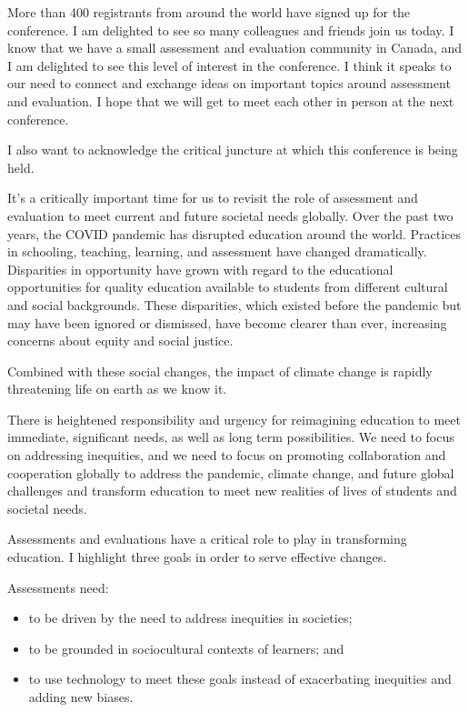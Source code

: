 \documentclass[
]{book}
\begin{document}
More than 400 registrants from around the world have signed up for the conference. I am delighted to see so many colleagues and friends join us today. I know that we have a small assessment and evaluation community in Canada, and I am delighted to see this level of interest in the conference. I think it speaks to our need to connect and exchange ideas on important topics around assessment and evaluation. I hope that we will get to meet each other in person at the next conference.

I also want to acknowledge the critical juncture at which this conference is being held.

It's a critically important time for us to revisit the role of assessment and evaluation to meet current and future societal needs globally. Over the past two years, the COVID pandemic has disrupted education around the world. Practices in schooling, teaching, learning, and assessment have changed dramatically. Disparities in opportunity have grown with regard to the educational opportunities for quality education available to students from different cultural and social backgrounds. These disparities, which existed before the pandemic but may have been ignored or dismissed, have become clearer than ever, increasing concerns about equity and social justice.

Combined with these social changes, the impact of climate change is rapidly threatening life on earth as we know it.

There is heightened responsibility and urgency for reimagining education to meet immediate, significant needs, as well as long term possibilities. We need to focus on addressing inequities, and we need to focus on promoting collaboration and cooperation globally to address the pandemic, climate change, and future global challenges and transform education to meet new realities of lives of students and societal needs.

Assessments and evaluations have a critical role to play in transforming education. I highlight three goals in order to serve effective changes.

Assessments need:

\begin{itemize}
\item
  to be driven by the need to address inequities in societies;
\item
  to be grounded in sociocultural contexts of learners; and
\item
  to use technology to meet these goals instead of exacerbating inequities and adding new biases.
\end{itemize}
\end{document}

